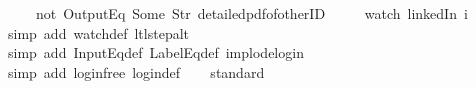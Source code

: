 \begin{isabellebody}
{\ \ \ \ \ {\isacharparenleft}not\ {\isacharparenleft}OutputEq\ {\isacharbrackleft}Some\ {\isacharparenleft}Str\ {\isacharprime}{\isacharprime}detailed{\isacharunderscore}pdf{\isacharunderscore}of{\isacharunderscore}otherID{\isacharprime}{\isacharprime}{\isacharparenright}{\isacharbrackright}{\isacharparenright}{\isacharparenright}{\isacharparenright}{\isacharparenright}{\isacharparenright}{\isacharparenright}{\isacharparenright}\isanewline
\ \ \ \ \ {\isacharparenleft}watch\ linkedIn\ i{\isacharparenright}{\isachardoublequoteclose}%
}%
%
\isadelimproof
\ \ %
\endisadelimproof
%
\isatagproof
{}\isamarkupfalse%
\ {\isacharparenleft}simp\ add{\isacharcolon}\ watch{\isacharunderscore}def\ ltl{\isacharunderscore}step{\isacharunderscore}alt{\isacharparenright}\isanewline
\ \ \isamarkupfalse%
\ {\isacharparenleft}simp\ add{\isacharcolon}\ InputEq{\isacharunderscore}def\ LabelEq{\isacharunderscore}def\ implode{\isacharunderscore}login{\isacharparenright}\isanewline
\ \ \isamarkupfalse%
\ {\isacharparenleft}simp\ add{\isacharcolon}\ login{\isacharunderscore}free\ login{\isacharunderscore}def{\isacharparenright}\isanewline
\ \ \isamarkupfalse%
\ standard\isanewline
\ \ \isamarkupfalse%
%
\endisatagproof
{\isafoldproof}%
%
\isadelimproof
%
\endisadelimproof
\isanewline
%
\isadelimtheory
\isanewline
%
\endisadelimtheory
%
\isatagtheory
{}\isamarkupfalse%
%
\endisatagtheory
{\isafoldtheory}%
%
\isadelimtheory
%
\endisadelimtheory
%
\end{isabellebody}%
\endinput
